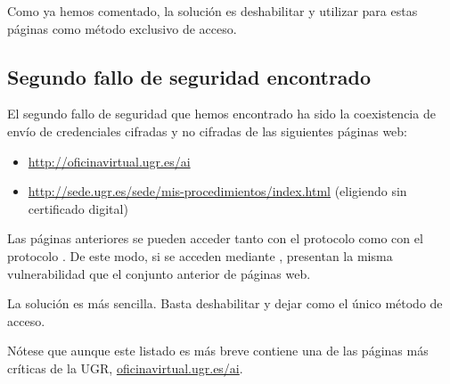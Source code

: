 Como ya hemos comentado, la solución es deshabilitar  y utilizar para estas páginas   como método exclusivo de acceso.


\subsection{Segundo fallo de seguridad encontrado}

El segundo fallo de seguridad que hemos encontrado ha sido la coexistencia de envío de credenciales cifradas y no cifradas de las siguientes páginas web:

\begin{itemize}
  \setlength\itemsep{0.1em}
  \item \url{http://oficinavirtual.ugr.es/ai}
  \item \url{http://sede.ugr.es/sede/mis-procedimientos/index.html} (eligiendo sin certificado digital)
\end{itemize}
Las páginas anteriores se pueden acceder tanto con el protocolo   como con el protocolo . De este modo, si se acceden mediante  , presentan la misma vulnerabilidad que el conjunto anterior de páginas web.

La solución es más sencilla. Basta deshabilitar  y dejar   como el único método de acceso.

Nótese que aunque este listado es más breve contiene una de las páginas más críticas de la UGR, \href{http://oficinavirtual.ugr.es/ai}{oficinavirtual.ugr.es/ai}.
